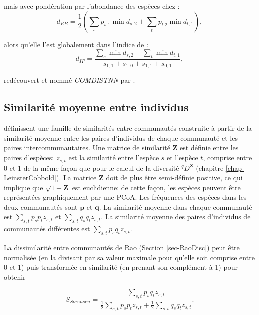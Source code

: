 \documentclass[
  11pt,
  french,
  a4paper,
  extrafontsizes,onecolumn,openright
  ]{memoir}
\begin{document}
mais avec pondération par l'abondance des espèces chez \textcite{Ricotta2008} :
\begin{equation}
  \label{eq:Ricotta2008}
  d_{\mathit{RB}} = \frac{1}{2}\left( \sum_s{p_{s|1}\min{d_{s,2}}} + \sum_t{p_{t|2}\min{d_{t,1}}} \right),
\end{equation}

alors qu'elle l'est globalement dans l'indice de \textcite{Izsak2001} :
\begin{equation}
  \label{eq:Izsak2001}
  d_{\mathit{IP}} = \frac{\sum_s{\min{d_{s,2}}} + \sum_t{\min{d_{t,1}}}}{s_{1,1}+s_{1,0}+s_{1,1}+s_{0,1}},
\end{equation}

redécouvert et nommé \emph{COMDISTNN} par \textcite{Webb2008}.

\hypertarget{similarituxe9-moyenne-entre-individus}{%
\subsection{Similarité moyenne entre individus}\label{similarituxe9-moyenne-entre-individus}}

\textcite{Pavoine2014b} définissent une famille de similarités entre communautés construite à partir de la similarité moyenne entre les paires d'individus de chaque communauté et les paires intercommunautaires.
Une matrice de similarité \(\mathbf{Z}\) est définie entre les paires d'espèces: \(z_{s,t}\) est la similarité entre l'espèce \(s\) et l'espèce \(t\), comprise entre 0 et 1 de la même façon que pour le calcul de la diversité \(^q\!D^{\mathbf{Z}}\) (chapitre \ref{chap-LeinsterCobbold}).
La matrice \(\mathbf{Z}\) doit de plus être semi-définie positive, ce qui implique que \(\sqrt{1-\mathbf{Z}}\) est euclidienne: de cette façon, les espèces peuvent être représentées graphiquement par une PCoA.
Les fréquences des espèces dans les deux communautés sont \(\mathbf{p}\) et \(\mathbf{q}\).
La similarité moyenne dans chaque communauté est \(\sum_{s,t}{p_s p_t z_{s,t}}\) et \(\sum_{s,t}{q_s q_t z_{s,t}}\).
La similarité moyenne des paires d'individus de communautés différentes est \(\sum_{s,t}{p_s q_t z_{s,t}}\).

La dissimilarité entre communautés de Rao (Section \ref{sec-RaoDisc}) peut être normalisée (en la divisant par sa valeur maximale pour qu'elle soit comprise entre 0 et 1) puis transformée en similarité (en prenant son complément à 1) pour obtenir

\begin{equation}
  \label{eq:SorensenAbd}
  S_{\mathit{Sorensen}} = \frac{\sum_{s,t}{p_s q_t z_{s,t}}}{\frac{1}{2}\sum_{s,t}{p_s p_t z_{s,t}} + \frac{1}{2}\sum_{s,t}{q_s q_t z_{s,t}}}.
\end{equation}
\end{document}
